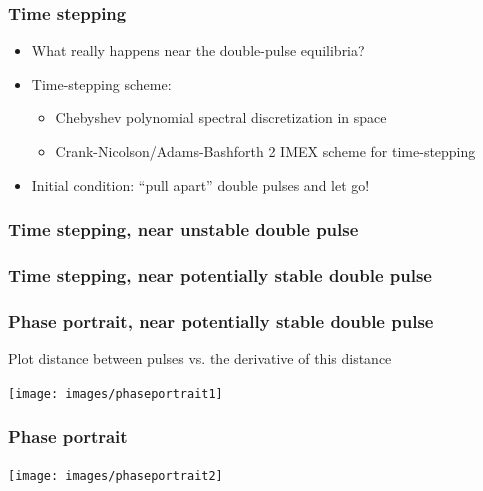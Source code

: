 \documentclass[16pt]{beamer}
\begin{document}
\begin{frame}
	\frametitle{Time stepping}
	\fontsize{16}{7.2}\selectfont
	\begin{itemize}
		\item<1->What really happens near the double-pulse equilibria?
		\item<2->Time-stepping scheme:
		\begin{itemize}
			\item Chebyshev polynomial spectral discretization in space
			\item Crank-Nicolson/Adams-Bashforth 2 IMEX scheme for time-stepping
		\end{itemize}
		\item<3->Initial condition: ``pull apart'' double pulses and let go!
	\end{itemize}
\end{frame}

\begin{frame}
	\frametitle{Time stepping, near unstable double pulse}
	\fontsize{16}{7.2}\selectfont
	\begin{center}
	\end{center}
\end{frame}

\begin{frame}
	\frametitle{Time stepping, near potentially stable double pulse}
	\fontsize{16}{7.2}\selectfont
	\begin{center}
	\end{center}
\end{frame}

\begin{frame}
	\frametitle{Phase portrait, near potentially stable double pulse}
	\fontsize{16}{7.2}\selectfont
	Plot distance between pulses vs. the derivative of this distance
	\begin{center}
	\texttt{[image: images/phaseportrait1]}
	\end{center}
\end{frame}

\begin{frame}
	\frametitle{Phase portrait}
	\fontsize{16}{7.2}\selectfont
	\begin{center}
	\texttt{[image: images/phaseportrait2]}
	\end{center}
\end{frame}
\end{document}
